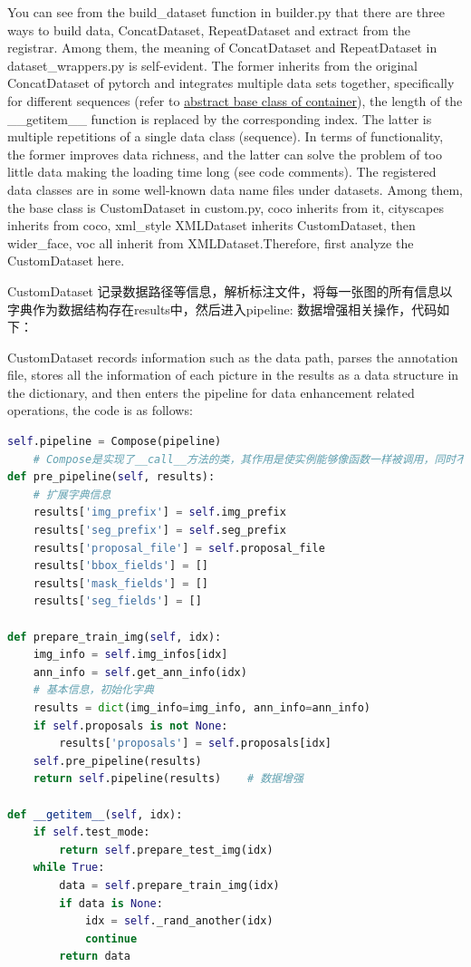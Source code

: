 \documentclass[UTF8]{ctexart}
\begin{document}
You can see from the build\_dataset function in builder.py that there are three ways to build data, ConcatDataset,
RepeatDataset and extract from the registrar. Among them, the meaning of ConcatDataset and RepeatDataset 
in dataset\_wrappers.py is self-evident. The former inherits from the original ConcatDataset of pytorch and integrates 
multiple data sets together, specifically for different sequences 
(refer to \href{https://docs.python.org /zh-cn/3/library/collections.abc.html}{abstract base class of container}), 
the length of the \_\_getitem\_\_ function is replaced by the corresponding index. The latter is multiple repetitions 
of a single data class (sequence). In terms of functionality, the former improves data richness, and the latter can solve 
the problem of too little data making the loading time long (see code comments). The registered data classes are in 
some well-known data name files under datasets. Among them, the base class is CustomDataset in custom.py, coco inherits 
from it, cityscapes inherits from coco, xml\_style XMLDataset inherits CustomDataset, then wider\_face, voc all inherit 
from XMLDataset.Therefore, first analyze the CustomDataset here.

CustomDataset 记录数据路径等信息，解析标注文件，将每一张图的所有信息以字典作为数据结构存在results中，然后进入pipeline:
数据增强相关操作，代码如下：

CustomDataset records information such as the data path, parses the annotation file, stores all the information of 
each picture in the results as a data structure in the dictionary, and then enters the pipeline for data enhancement 
related operations, the code is as follows:

\lstset{style=mystyle}
\begin{lstlisting}[language=Python]
	self.pipeline = Compose(pipeline)   
	# Compose是实现了__call__方法的类，其作用是使实例能够像函数一样被调用，同时不影响实例本身的生命周期
def pre_pipeline(self, results):
	# 扩展字典信息
	results['img_prefix'] = self.img_prefix
	results['seg_prefix'] = self.seg_prefix
	results['proposal_file'] = self.proposal_file
	results['bbox_fields'] = []
	results['mask_fields'] = []
	results['seg_fields'] = []

def prepare_train_img(self, idx):
	img_info = self.img_infos[idx]
	ann_info = self.get_ann_info(idx)
	# 基本信息，初始化字典
	results = dict(img_info=img_info, ann_info=ann_info)
	if self.proposals is not None:
		results['proposals'] = self.proposals[idx]
	self.pre_pipeline(results)
	return self.pipeline(results)    # 数据增强

def __getitem__(self, idx):
	if self.test_mode:
		return self.prepare_test_img(idx)
	while True:
		data = self.prepare_train_img(idx)
		if data is None:
			idx = self._rand_another(idx)
			continue
		return data
\end{lstlisting}
\end{document}
